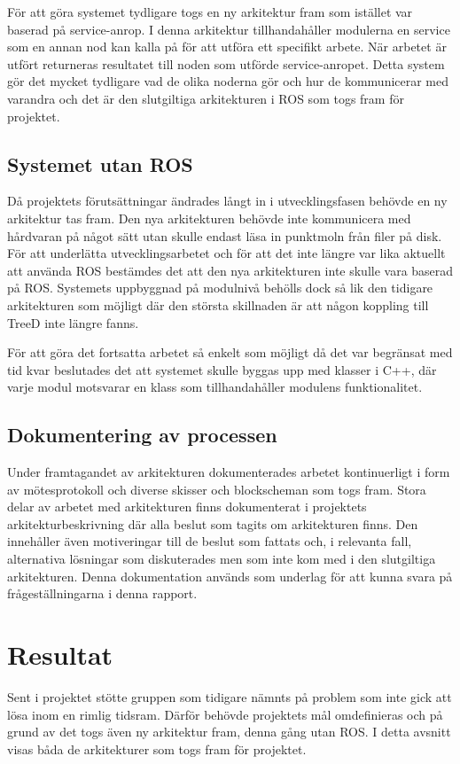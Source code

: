 För att göra systemet tydligare togs en ny arkitektur fram som istället var baserad på service-anrop. I denna arkitektur tillhandahåller modulerna en service som en annan nod kan kalla på för att utföra ett specifikt arbete. När arbetet är utfört returneras resultatet till noden som utförde service-anropet. Detta system gör det mycket tydligare vad de olika noderna gör och hur de kommunicerar med varandra och det är den slutgiltiga arkitekturen i ROS som togs fram för projektet.

\subsection{Systemet utan ROS}
Då projektets förutsättningar ändrades långt in i utvecklingsfasen behövde en ny arkitektur tas fram. Den nya arkitekturen behövde inte kommunicera med hårdvaran på något sätt utan skulle endast läsa in punktmoln från filer på disk. För att underlätta utvecklingsarbetet och för att det inte längre var lika aktuellt att använda ROS bestämdes det att den nya arkitekturen inte skulle vara baserad på ROS. Systemets uppbyggnad på modulnivå behölls dock så lik den tidigare arkitekturen som möjligt där den största skillnaden är att någon koppling till TreeD inte längre fanns.

För att göra det fortsatta arbetet så enkelt som möjligt då det var begränsat med tid kvar beslutades det att systemet skulle byggas upp med klasser i C++, där varje modul motsvarar en klass som tillhandahåller modulens funktionalitet.

\subsection{Dokumentering av processen}
Under framtagandet av arkitekturen dokumenterades arbetet kontinuerligt i form av mötesprotokoll och diverse skisser och blockscheman som togs fram. Stora delar av arbetet med arkitekturen finns dokumenterat i projektets arkitekturbeskrivning där alla beslut som tagits om arkitekturen finns. Den innehåller även motiveringar till de beslut som fattats och, i relevanta fall, alternativa lösningar som diskuterades men som inte kom med i den slutgiltiga arkitekturen. Denna dokumentation används som underlag för att kunna svara på frågeställningarna i denna rapport.


\section{Resultat}
\label{sec:results-lundberg}
Sent i projektet stötte gruppen som tidigare nämnts på problem som inte gick att lösa inom en rimlig tidsram. Därför behövde projektets mål omdefinieras och på grund av det togs även ny arkitektur fram, denna gång utan ROS. I detta avsnitt visas båda de arkitekturer som togs fram för projektet.

